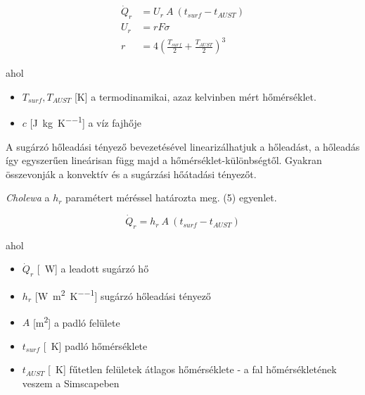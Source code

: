 \begin{equation} \label{eq_radiant_kilkis}
\begin{aligned}
\dot Q_{r} &= U_r ~ A~ \left(t_{surf}-t_{AUST}\right)\\[8pt]
U_r&=rF\sigma\\
r&=4 \left(\frac{T_{surf}}{2}+\frac{T_{AUST}}{2}\right)^3
\end{aligned}
\end{equation}


ahol
\begin{itemize}[itemsep=9pt,topsep=0pt,parsep=0pt,partopsep=0pt]
	\item[] $T_{surf}, T_{AUST}$ [\si{\kelvin}] a termodinamikai, azaz kelvinben mért hőmérséklet.
	\item[] $c$ [\si[per-mode = fraction]{\joule\per\kg\per\kelvin}] a víz fajhője
\end{itemize}

A sugárzó hőleadási tényező bevezetésével linearizálhatjuk a hőleadást, a hőleadás így egyszerűen lineárisan függ majd a hőmérséklet-különbségtől. Gyakran összevonják a konvektív és a sugárzási hőátadási tényezőt.

\textit{Cholewa} \cite{CHOLEWA2013599} a $h_r$ paramétert méréssel határozta meg. (5) egyenlet.



\begin{equation} \label{eq_radiative_hr_linear}
\dot Q_{r} = h_r ~ A ~ \left(t_{surf}-t_{AUST}\right)
\end{equation}

ahol
\begin{itemize}[itemsep=3pt,topsep=0pt,parsep=0pt,partopsep=0pt]
	\item[] $\dot{Q}_{r}$ [\SI{}{\watt}] a leadott sugárzó hő
	\item[] $h_r$ [\si[per-mode = fraction]{\watt\per\meter\squared\per\kelvin}] sugárzó hőleadási tényező
	\item[] $A$ [\si{\metre\squared}] a padló felülete
	\item[] $t_{surf}$ [\SI{}{\kelvin}] padló hőmérséklete
	\item[] $t_{AUST}$ [\SI{}{\kelvin}] fűtetlen felületek átlagos hőmérséklete - a fal hőmérsékletének veszem a Simscapeben
\end{itemize}


